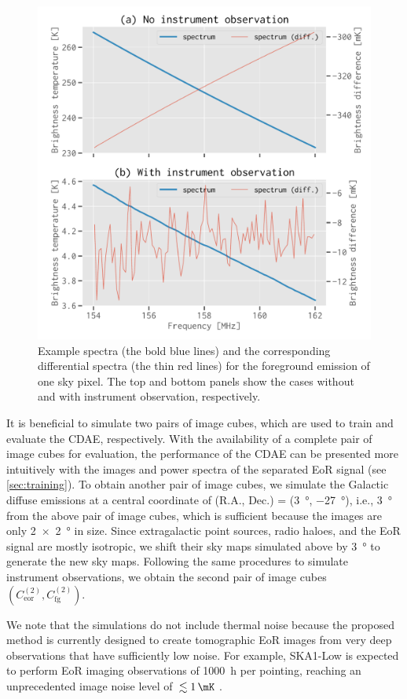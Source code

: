 \documentclass[fleqn,usenatbib]{mnras}
\newlength{\myfigwidth}
\newcommand{\R}[1]{\mathrm{#1}}
\newcommand{\editwip}[1]{{\leavevmode\color{magenta}#1}}
\begin{document}
\begin{figure}
  \centering
  \includegraphics[width=\myfigwidth]{simudata}
  \caption{\label{fig:simudata}%
    Example spectra (the bold blue lines) and the corresponding
    differential spectra (the thin red lines) for the foreground
    emission of one sky pixel.
    The top and bottom panels show the cases without and with
    instrument observation, respectively.
  }
\end{figure}

\editwip{%
It is beneficial to simulate two pairs of image cubes, which are used to
train and evaluate the CDAE, respectively.
With the availability of a complete pair of image cubes for evaluation,
the performance of the CDAE can be presented more intuitively with the
images and power spectra of the separated EoR signal (see
\autoref{sec:training}).
To obtain another pair of image cubes, we simulate the Galactic diffuse
emissions at a central coordinate of (R.A., Dec\@.) = (\SI{3}{\degree},
\SI{-27}{\degree}), i.e., \SI{3}{\degree} from the above pair of image
cubes, which is sufficient because the images are only \SI{2 x 2}{\degree}
in size.
Since extragalactic point sources, radio haloes, and the EoR signal are
mostly isotropic, we shift their sky maps simulated above by
\SI{3}{\degree} to generate the new sky maps.
Following the same procedures to simulate instrument observations, we
obtain the second pair of image cubes
$\left( C_{\R{eor}}^{(2)}, C_{\R{fg}}^{(2)} \right)$.

We note that the simulations do not include thermal noise because the
proposed method is currently designed to create tomographic EoR images
from very deep observations that have sufficiently low noise.
For example, SKA1-Low is expected to perform EoR imaging observations of
\SI{1000}{\hour} per pointing, reaching an unprecedented image noise level
of $\,\lesssim \SI{1}{\mK}$ \citep[e.g.,][]{mellema2013rev,koopmans2015rev}.
} %
\end{document}
